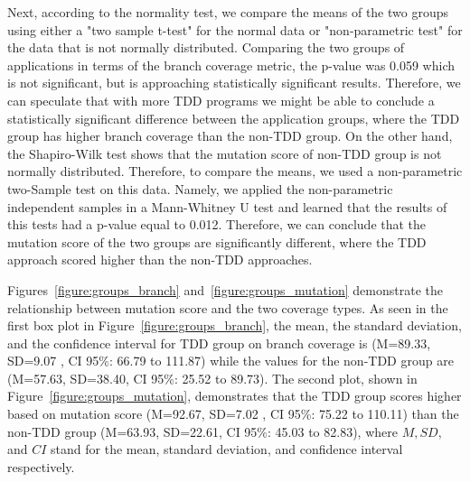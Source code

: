 \documentclass[conference]{IEEEtran}
\begin{document}
Next, according to the normality test, we compare the means of the two groups using either a "two sample t-test" for the normal data or "non-parametric test" for the data that is not normally distributed. Comparing the two groups of applications in terms of the branch coverage metric, the p-value was 0.059 which is not significant, but is approaching statistically significant results. Therefore, we can speculate that with more TDD programs we might be able to conclude a statistically significant difference between the application groups, where the TDD group has higher branch coverage than the non-TDD group. On the other hand, the Shapiro-Wilk test shows that the mutation score of non-TDD group is not normally distributed. Therefore, to compare the means, we used a non-parametric two-Sample test on this data. Namely, we applied the non-parametric independent samples in a Mann-Whitney U test and learned that the results of this tests had a p-value equal to 0.012. Therefore, we can conclude that the mutation score of the two groups are significantly different, where the TDD approach scored higher than the non-TDD approaches.

Figures~\ref{figure:groups_branch} and~\ref{figure:groups_mutation} demonstrate the relationship between mutation score and the two coverage types. As seen in the first box plot in Figure~\ref{figure:groups_branch}, the mean, the standard deviation, and the confidence interval for TDD group on branch coverage is (M=89.33, SD=9.07 , CI 95\%: 66.79 to 111.87) while the values for the non-TDD group are (M=57.63, SD=38.40, CI 95\%: 25.52 to 89.73). The second plot, shown in Figure~\ref{figure:groups_mutation}, demonstrates that the TDD group scores higher based on mutation score (M=92.67, SD=7.02 , CI 95\%: 75.22 to 110.11) than the non-TDD group (M=63.93, SD=22.61, CI 95\%: 45.03 to 82.83), where $M, SD,$ and $CI$ stand for the mean, standard deviation, and confidence interval respectively.    
\end{document}

